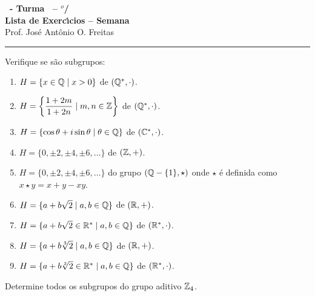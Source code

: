 \documentclass[12pt]{exam}
\begin{document}
\begin{center}
    
    {\Large\bf \disciplina\ - Turma \turma\ -- \semestre$^{o}$/\ano} \\ \vspace{9pt} {\large\bf
        Lista de Exerc{\'\i}cios -- Semana \numerosemana}\\ \vspace{9pt} Prof. Jos{\'e} Ant{\^o}nio O. Freitas
    \end{center}
    \hrule

    \vspace{.6cm}
    
    \questao{} Verifique se s\~ao subgrupos:
    \begin{enumerate}[label=({\alph*})]
      \item $H = \{x \in \mathbb{Q} \mid x > 0\}$ de $(\mathbb{Q}^*,\cdot)$.

      \item $H = \left\{\dfrac{1 + 2m}{1 + 2n} \mid m, n \in \mathbb{Z}\right\}$ de $(\mathbb{Q}^*,\cdot)$.

      \item $H = \{\cos\theta + i\sin\theta \mid \theta \in \mathbb{Q}\}$ de $(\mathbb{C}^*,\cdot)$.

      \item $H = \{0, \pm 2, \pm 4, \pm 6, \dots\}$ de $(\mathbb{Z},+)$.

      \item $H = \{0, \pm 2, \pm 4, \pm 6, \dots\}$ do grupo $(\mathbb{Q} - \{1\},\star)$ onde $\star$ \'e definida como $x \star y = x + y - xy$.

      \item $H = \{a + b\sqrt{2} \mid a, b \in \mathbb{Q}\}$ de $(\mathbb{R},+)$.

      \item $H = \{a + b\sqrt{2} \in \mathbb{R}^* \mid a, b \in \mathbb{Q}\}$ de $(\mathbb{R}^*,\cdot)$.

      \item $H = \{a + b\sqrt[3]{2} \mid a, b \in \mathbb{Q}\}$ de $(\mathbb{R},+)$.

      \item $H = \{a + b\sqrt[3]{2} \in \mathbb{R}^* \mid a, b \in \mathbb{Q}\}$ de $(\mathbb{R}^*,\cdot)$.
    \end{enumerate}

    \vspace{.3cm}

    \questao{} Determine todos os subgrupos do grupo aditivo $\mathbb{Z}_4$.

    \vspace{.3cm}
\end{document}
